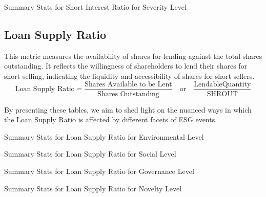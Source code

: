 \begin{table}[H]
\caption{Summary Stats for Short Interest Ratio for Severity Level}
\centering

\label{table:short_interest_ratio_severity.tex}
\end{table}


\subsection{Loan Supply Ratio}


This metric measures the availability of shares for lending against the total shares outstanding. It reflects the willingness of shareholders to lend their shares for short selling, indicating the liquidity and accessibility of shares for short sellers.
 \begin{equation}
	\text{Loan Supply Ratio} = \frac{\text{Shares Available to be Lent}}{\text{Shares Outstanding}} \quad \text{or} \quad \frac{\text{LendableQuantity}}{\text{SHROUT}}
	\label{eq:Loan_Supply_Ratio}
\end{equation}

By presenting these tables, we aim to shed light on the nuanced ways in which the Loan Supply Ratio is affected by different facets of ESG events.

\begin{table}[H]
\caption{Summary Stats for Loan Supply Ratio for Environmental Level}
\centering

\label{table:loan_supply_ratio_environment.tex}
\end{table}

\begin{table}[H]
\caption{Summary Stats for Loan Supply Ratio for Social Level}
\centering

\label{table:loan_supply_ratio_social.tex}
\end{table}

\begin{table}[H]
\caption{Summary Stats for Loan Supply Ratio for Governance Level}
\centering

\label{table:loan_supply_ratio_governance.tex}
\end{table}


\begin{table}[H]
\caption{Summary Stats for Loan Supply Ratio for Novelty Level}
\centering

\label{table:loan_supply_ratio_novelty.tex}
\end{table}

